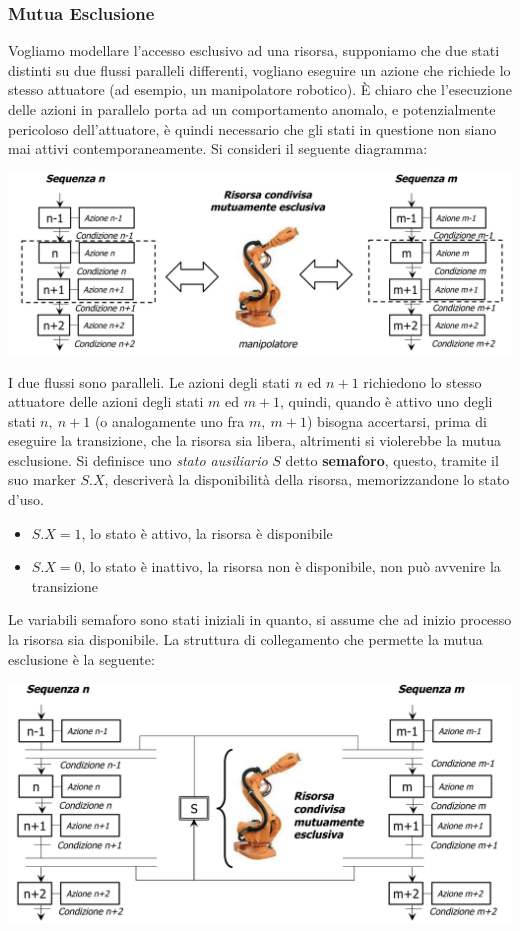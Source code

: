 \documentclass[10pt, letterpaper]{report}
\begin{document}
\subsubsection{Mutua Esclusione}
Vogliamo modellare l'accesso esclusivo ad una risorsa, supponiamo che due stati distinti su due flussi paralleli differenti, vogliano eseguire un azione che richiede lo stesso attuatore (ad esempio, un manipolatore robotico). È chiaro che l'esecuzione delle azioni in parallelo porta ad un comportamento anomalo, e potenzialmente pericoloso dell'attuatore, è quindi necessario che gli stati in questione non siano mai attivi contemporaneamente.\acc 
Si consideri il seguente diagramma:
\begin{center}
    \includegraphics[width=1\textwidth ]{images/mutuaEsclusione.png}
\end{center}
I due flussi sono paralleli. Le azioni degli stati $n$ ed $n+1$ richiedono lo stesso attuatore delle azioni degli stati $m$ ed $m+1$, quindi, quando è attivo uno degli stati $n,\ n+1$ (o analogamente uno fra $m, \ m+1$) bisogna accertarsi, prima di eseguire la transizione, che la risorsa sia libera, altrimenti si violerebbe la mutua esclusione.\acc 
Si definisce uno \textit{stato ausiliario} $S$ detto \textbf{semaforo}, questo, tramite il suo marker $S.X$, descriverà la disponibilità della risorsa, memorizzandone lo stato d'uso. \begin{itemize}
    \item $S.X=1$, lo stato è attivo, la risorsa è disponibile 
    \item $S.X=0$, lo stato è inattivo, la risorsa non è disponibile, non può avvenire la transizione
\end{itemize} 
Le variabili semaforo sono stati iniziali in quanto, si assume che ad inizio processo la risorsa sia disponibile. La struttura di collegamento che permette la mutua esclusione è la seguente:
\begin{center}
    \includegraphics[width=1\textwidth ]{images/mutuaEsclusione2.png}
\end{center}
\end{document}
